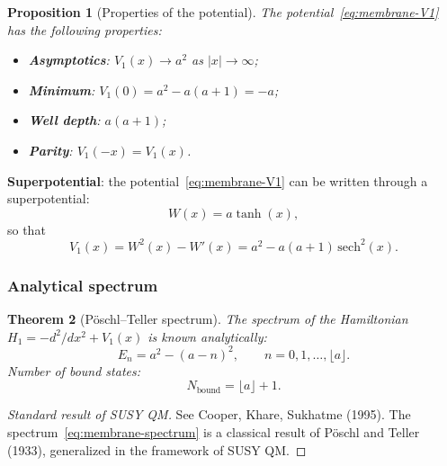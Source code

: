 \documentclass[11pt,a4paper]{article}
\newtheorem{theorem}{Theorem}[section]
\newtheorem{proposition}[theorem]{Proposition}
\theoremstyle{definition}
\begin{document}
\begin{proposition}[Properties of the potential]
\label{prop:membrane-V-properties}
The potential~\eqref{eq:membrane-V1} has the following properties:
\begin{itemize}
    \item \textbf{Asymptotics}: $V_1(x) \to a^2$ as $|x| \to \infty$;
    \item \textbf{Minimum}: $V_1(0) = a^2 - a(a+1) = -a$;
    \item \textbf{Well depth}: $a(a+1)$;
    \item \textbf{Parity}: $V_1(-x) = V_1(x)$.
\end{itemize}
\end{proposition}

\medskip\noindent
\textbf{Superpotential}: the potential~\eqref{eq:membrane-V1} can be
written through a superpotential:
\begin{equation}
    W(x) = a \tanh(x),
    \label{eq:membrane-W}
\end{equation}
so that
\begin{equation}
    V_1(x) = W^2(x) - W'(x) = a^2 - a(a+1) \, \mathrm{sech}^2(x).
    \label{eq:membrane-V1-from-W}
\end{equation}

\subsubsection{Analytical spectrum}

\begin{theorem}[P\"oschl--Teller spectrum]
\label{thm:membrane-spectrum}
The spectrum of the Hamiltonian $H_1 = -d^2/dx^2 + V_1(x)$ is known
analytically:
\begin{equation}
    \boxed{
    E_n = a^2 - (a - n)^2, \qquad n = 0, 1, \ldots, \lfloor a \rfloor.
    }
    \label{eq:membrane-spectrum}
\end{equation}
Number of bound states:
\begin{equation}
    N_{\text{bound}} = \lfloor a \rfloor + 1.
    \label{eq:membrane-bound-states}
\end{equation}
\end{theorem}

\begin{proof}[Standard result of SUSY QM]
See Cooper, Khare, Sukhatme (1995). The spectrum~\eqref{eq:membrane-spectrum}
is a classical result of P\"oschl and Teller (1933), generalized
in the framework of SUSY QM.
\end{proof}
\end{document}

